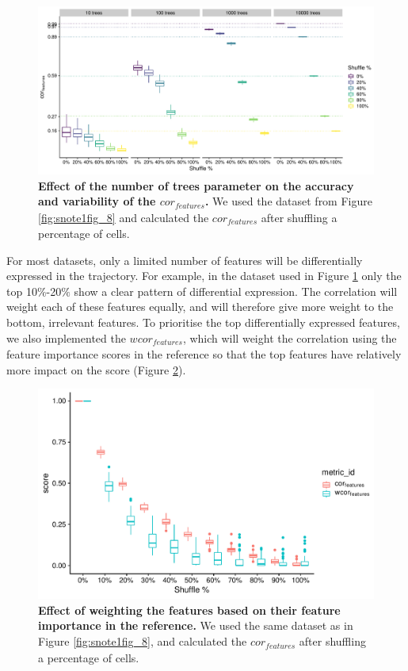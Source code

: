 \begin{figure}
	\centering\includegraphics[width=\linewidth]{fig/dynbenchmark/snote1fig_9.pdf}
	\caption{
		\textbf{Effect of the number of trees parameter on the accuracy and variability of the $\textit{cor}_{\textit{features}}$.} 
		We used the dataset from Figure \ref{fig:snote1fig_8} and calculated the $\textit{cor}_{\textit{features}}$ after shuffling a percentage of cells.
	}
	\label{fig:snote1fig_9}
\end{figure}

For most datasets, only a limited number of features will be differentially expressed in the trajectory. For example, in the dataset used in Figure \ref{fig:snote1fig_9} only the top 10$\%$-20$\%$ show a clear pattern of differential expression. The correlation will weight each of these features equally, and will therefore give more weight to the bottom, irrelevant features. To prioritise the top differentially expressed features, we also implemented the $\textit{wcor}_{\textit{features}}$, which will weight the correlation using the feature importance scores in the reference so that the top features have relatively more impact on the score (Figure \ref{fig:snote1fig_10}).

\begin{figure}
	\centering\includegraphics[width=\linewidth]{fig/dynbenchmark/snote1fig_10.pdf}
	\caption{
		\textbf{Effect of weighting the features based on their feature importance in the reference.} 
		We used the same dataset as in Figure \ref{fig:snote1fig_8}, and calculated the $\textit{cor}_{\textit{features}}$ after shuffling a percentage of cells.
	}
	\label{fig:snote1fig_10}
\end{figure}


